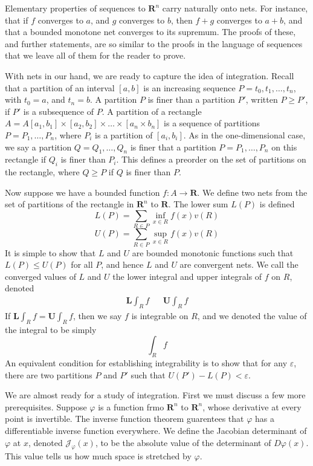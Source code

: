 \documentclass[12pt]{amsbook}
\theoremstyle{plain}
\theoremstyle{definition}
\begin{document}
Elementary properties of sequences to $\mathbf{R}^n$ carry naturally onto nets. For instance, that if $f$ converges to $a$, and $g$ converges to $b$, then $f + g$ converges to $a + b$, and that a bounded monotone net converges to its supremum. The proofs of these, and further statements, are so similar to the proofs in the language of sequences that we leave all of them for the reader to prove.

With nets in our hand, we are ready to capture the idea of integration. Recall that a partition of an interval $[a,b]$ is an increasing sequence $P = t_0, t_1, \dots, t_n$, with $t_0 = a$, and $t_n = b$. A partition $P$ is finer than a partition $P'$, written $P \geq P'$, if $P'$ is a subsequence of $P$. A partition of a rectangle $A = A[a_1, b_1] \times [a_2, b_2] \times \dots \times [a_n \times b_n]$ is a sequence of partitions $P = P_1, \dots, P_n$, where $P_i$ is a partition of $[a_i, b_i]$. As in the one-dimensional case, we say a partition $Q = Q_1, \dots, Q_n$ is finer that a partition $P = P_1, \dots, P_n$ on this rectangle if $Q_i$ is finer than $P_i$. This defines a preorder on the set of partitions on the rectangle, where $Q \geq P$ if $Q$ is finer than $P$.

Now suppose we have a bounded function $f:A \to \mathbf{R}$. We define two nets from the set of partitions of the rectangle in $\mathbf{R}^n$ to $\mathbf{R}$. The lower sum $L(P)$ is defined
%
\[ L(P) = \sum_{R \in P} \inf_{x \in R} f(x) v(R) \]
%
\[ U(P) = \sum_{R \in P} \sup_{x \in R} f(x) v(R) \]
%
It is simple to show that $L$ and $U$ are bounded monotonic functions such that $L(P) \leq U(P)$ for all $P$, and hence $L$ and $U$ are convergent nets. We call the converged values of $L$ and $U$ the lower integral and upper integrals of $f$ on $R$, denoted
%
\begin{align*}
    \mathbf{L} \int_R f && \mathbf{U} \int_R f
\end{align*}
%
If $\mathbf{L} \int_R f = \mathbf{U} \int_R f$, then we say $f$ is integrable on $R$, and we denoted the value of the integral to be simply
%
\[ \int_R f \]
%
An equivalent condition for establishing integrability is to show that for any $\varepsilon$, there are two partitions $P$ and $P'$ such that $U(P') - L(P) < \varepsilon$.

We are almost ready for a study of integration. First we must discuss a few more prerequisites. Suppose $\varphi$ is a function frmo $\mathbf{R}^n$ to $\mathbf{R}^n$, whose derivative at every point is invertible. The inverse function theorem guarentees that $\varphi$ has a differentiable inverse function everywhere. We define the Jacobian determinant of $\varphi$ at $x$, denoted $\mathcal{J}_\varphi(x)$, to be the absolute value of the determinant of $D\varphi(x)$. This value tells us how much space is stretched by $\varphi$.
\end{document}
